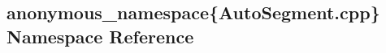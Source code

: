 \hypertarget{namespaceanonymous__namespace_02AutoSegment_8cpp_03}{\subsection{anonymous\-\_\-namespace\{Auto\-Segment.\-cpp\} Namespace Reference}
\label{namespaceanonymous__namespace_02AutoSegment_8cpp_03}
}
